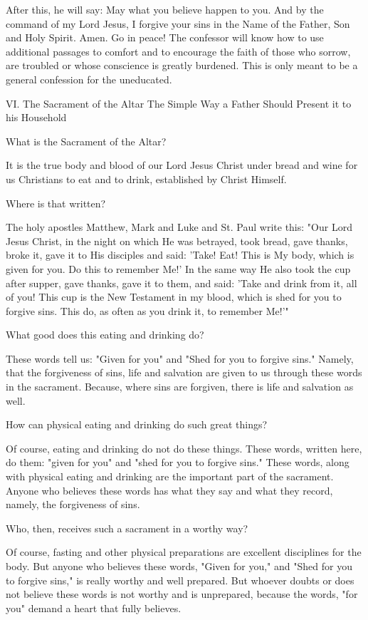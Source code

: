After this, he will say:
May what you believe happen to you. And by the command of my Lord
Jesus, I forgive your sins in the Name of the Father, Son and Holy
Spirit. Amen. Go in peace! The confessor will know how to use
additional passages to comfort and to encourage the faith of those who
sorrow, are troubled or whose conscience is greatly burdened. This is
only meant to be a general confession for the uneducated.

VI. The Sacrament of the Altar
The Simple Way a Father Should Present it to his Household

What is the Sacrament of the Altar?

It is the true body and blood of our Lord Jesus Christ under bread and
wine for us Christians to eat and to drink, established by Christ
Himself.

Where is that written?

The holy apostles Matthew, Mark and Luke and St. Paul write this:
"Our Lord Jesus Christ, in the night on which He was betrayed, took
bread, gave thanks, broke it, gave it to His disciples and said: 'Take!
Eat! This is My body, which is given for you. Do this to remember Me!'
In the same way He also took the cup after supper, gave thanks, gave it
to them, and said: 'Take and drink from it, all of you! This cup is the
New Testament in my blood, which is shed for you to forgive sins. This
do, as often as you drink it, to remember Me!'"

What good does this eating and drinking do?

These words tell us: "Given for you" and "Shed for you to forgive
sins." Namely, that the forgiveness of sins, life and salvation are
given to us through these words in the sacrament. Because, where sins
are forgiven, there is life and salvation as well.

How can physical eating and drinking do such great things?

Of course, eating and drinking do not do these things. These words,
written here, do them: "given for you" and "shed for you to forgive
sins." These words, along with physical eating and drinking are the
important part of the sacrament. Anyone who believes these words has
what they say and what they record, namely, the forgiveness of sins.

Who, then, receives such a sacrament in a worthy way?

Of course, fasting and other physical preparations are excellent
disciplines for the body. But anyone who believes these words, "Given
for you," and "Shed for you to forgive sins," is really worthy and well
prepared. But whoever doubts or does not believe these words is not
worthy and is unprepared, because the words, "for you" demand a heart
that fully believes.

